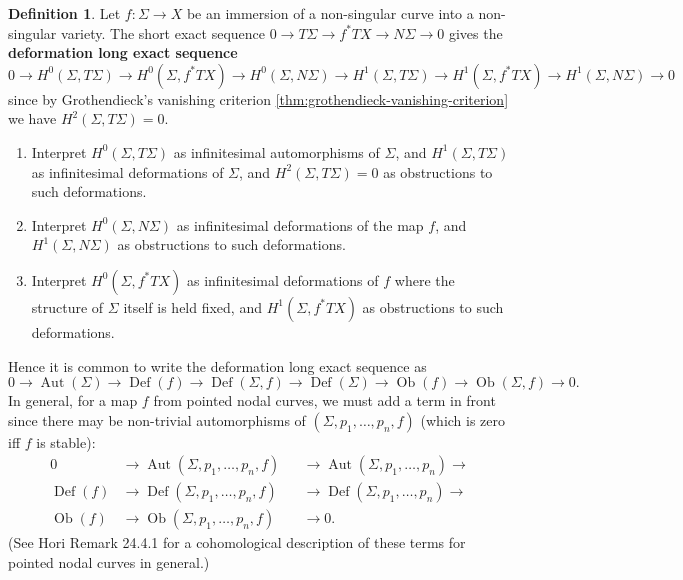 \documentclass{report}
\theoremstyle{plain}
\theoremstyle{definition}
\newtheorem{definition}[theorem]{Definition}
\theoremstyle{remark}
\DeclareMathOperator{\Aut}{Aut}
\DeclareMathOperator{\Ob}{Ob}
\DeclareMathOperator{\Def}{Def}
\begin{document}
\begin{definition}
  Let $f\colon \Sigma \to X$ be an immersion of a non-singular curve
  into a non-singular variety. The short exact sequence $0 \to T\Sigma
  \to f^*TX \to N\Sigma \to 0$ gives the {\bf deformation long exact
    sequence}
  \[ 0 \to H^0(\Sigma, T\Sigma) \to H^0(\Sigma, f^*TX) \to H^0(\Sigma, N\Sigma) \to H^1(\Sigma, T\Sigma) \to H^1(\Sigma, f^*TX) \to H^1(\Sigma, N\Sigma) \to 0 \]
  since by Grothendieck's vanishing criterion
  \ref{thm:grothendieck-vanishing-criterion} we have $H^2(\Sigma,
  T\Sigma) = 0$.
  \begin{enumerate}
  \item Interpret $H^0(\Sigma, T\Sigma)$ as infinitesimal
    automorphisms of $\Sigma$, and $H^1(\Sigma, T\Sigma)$ as
    infinitesimal deformations of $\Sigma$, and $H^2(\Sigma, T\Sigma)
    = 0$ as obstructions to such deformations.
  \item Interpret $H^0(\Sigma, N\Sigma)$ as infinitesimal deformations
    of the map $f$, and $H^1(\Sigma, N\Sigma)$ as obstructions to such
    deformations.
  \item Interpret $H^0(\Sigma, f^*TX)$ as infinitesimal deformations
    of $f$ where the structure of $\Sigma$ itself is held fixed, and
    $H^1(\Sigma, f^*TX)$ as obstructions to such deformations.
  \end{enumerate}
  Hence it is common to write the deformation long exact sequence as
  \[ 0 \to \Aut(\Sigma) \to \Def(f) \to \Def(\Sigma, f) \to \Def(\Sigma) \to \Ob(f) \to \Ob(\Sigma, f) \to 0. \]
  In general, for a map $f$ from pointed nodal curves, we must add a
  term in front since there may be non-trivial automorphisms of
  $(\Sigma, p_1, \ldots, p_n, f)$ (which is zero iff $f$ is stable):
  \begin{equation}\label{eq:deformation-long-exact-sequence}
  \begin{alignedat}{2} 
    0 &\to \Aut(\Sigma, p_1, \ldots, p_n, f) &&\to \Aut(\Sigma, p_1, \ldots, p_n) \to \\
    \Def(f) &\to \Def(\Sigma, p_1, \ldots, p_n, f) &&\to \Def(\Sigma, p_1, \ldots, p_n) \to \\
    \Ob(f) &\to \Ob(\Sigma, p_1, \ldots, p_n, f) &&\to 0.
  \end{alignedat}
  \end{equation}
  (See Hori Remark 24.4.1 for a cohomological description of these
  terms for pointed nodal curves in general.)
\end{definition}
\end{document}
